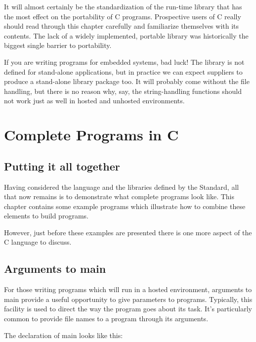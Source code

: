   It will almost certainly be the standardization of the run-time library
   that has the most effect on the portability of C programs.  Prospective
   users of C really should read through this chapter carefully and
   familiarize themselves with its contents.  The lack of a widely implemented,
   portable library was historically the biggest single barrier to
   portability.


  If you are writing programs for embedded systems, bad luck!  The library
   is not defined for stand-alone applications, but in practice we can expect
   suppliers to produce a stand-alone library package too.  It will probably
   come without the file handling, but there is no reason why, say, the
   string-handling functions should not work just as well in hosted and
   unhosted environments.


 \chapter{Complete Programs in C}


        \section{Putting it all together}
        

  

  Having considered the language and the libraries defined by the
   Standard, all that now remains is to demonstrate what complete programs
   look like. This chapter contains some example programs which illustrate
   how to combine these elements to build programs.


  However, just before these examples are presented there is one more
   aspect of the C language to discuss.


 
        \section{Arguments to main}
        

  

  For those writing programs which will run in a hosted environment,
   arguments to main provide a useful opportunity to give parameters to
   programs. Typically, this facility is used to direct the way the program
   goes about its task. It's particularly common to provide file names to a
   program through its arguments.


  The declaration of main looks like this:


